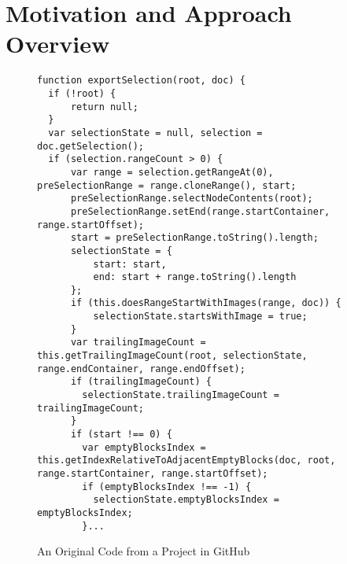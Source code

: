 \section{Motivation and Approach Overview}
\label{example_section}



\begin{figure}[t]
	\centering
	\begin{lstlisting}[]
function exportSelection(root, doc) {
  if (!root) {
      return null;
  }
  var selectionState = null, selection = doc.getSelection();
  if (selection.rangeCount > 0) {
      var range = selection.getRangeAt(0), preSelectionRange = range.cloneRange(), start;
      preSelectionRange.selectNodeContents(root);
      preSelectionRange.setEnd(range.startContainer, range.startOffset);
      start = preSelectionRange.toString().length;
      selectionState = {
          start: start,
          end: start + range.toString().length
      };
      if (this.doesRangeStartWithImages(range, doc)) {
          selectionState.startsWithImage = true;
      }
      var trailingImageCount = this.getTrailingImageCount(root, selectionState, range.endContainer, range.endOffset);
      if (trailingImageCount) {
        selectionState.trailingImageCount = trailingImageCount;
      }
      if (start !== 0) {
        var emptyBlocksIndex = this.getIndexRelativeToAdjacentEmptyBlocks(doc, root, range.startContainer, range.startOffset);
        if (emptyBlocksIndex !== -1) {
          selectionState.emptyBlocksIndex = emptyBlocksIndex;
        }...
        \end{lstlisting}
\vspace{-12pt}
\caption{An Original Code from a Project in GitHub}
\label{example_org}
\end{figure}


